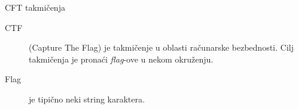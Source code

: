 \documentclass{beamer}
\begin{document}
\begin{frame}[fragile]
\begin{columns}[T]
\begin{column}{.46\textwidth}

            \begin{block}{CFT takmičenja}
                \begin{description}
                    \item [CTF] (Capture The Flag) je takmičenje u oblasti
                        računarske bezbednosti. Cilj takmičenja je pronaći
                        \emph{flag}-ove u nekom okruženju.
                    \item [Flag] je tipično neki string karaktera.
                \end{description}
            \end{block}



\end{column}
\end{columns}
\end{frame}
\end{document}
